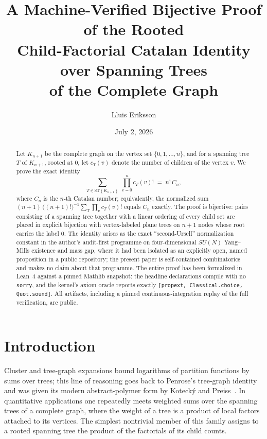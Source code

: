 \documentclass[11pt]{article}
\title{A Machine-Verified Bijective Proof of the Rooted\\
Child-Factorial Catalan Identity over Spanning Trees\\
of the Complete Graph}
\author{Lluis Eriksson}
\date{July 2, 2026}
\theoremstyle{remark}
\theoremstyle{definition}
\begin{document}
\maketitle

\begin{abstract}
Let $K_{n+1}$ be the complete graph on the vertex set $\{0,1,\dots,n\}$, and
for a spanning tree $T$ of $K_{n+1}$, rooted at $0$, let $c_T(v)$ denote the
number of children of the vertex $v$.  We prove the exact identity
\[
  \sum_{T \in \mathrm{ST}(K_{n+1})} \; \prod_{v=0}^{n} c_T(v)! \;=\; n!\,C_n ,
\]
where $C_n$ is the $n$-th Catalan number; equivalently, the normalized sum
$(n+1)\,\bigl((n+1)!\bigr)^{-1}\sum_T \prod_v c_T(v)!$ equals $C_n$ exactly.
The proof is bijective: pairs consisting of a spanning tree together with a
linear ordering of every child set are placed in explicit bijection with
vertex-labeled plane trees on $n+1$ nodes whose root carries the label $0$.
The identity arises as the exact ``second-Ursell'' normalization constant in
the author's audit-first programme on four-dimensional $SU(N)$ Yang--Mills
existence and mass gap, where it had been isolated as an explicitly
open, named proposition in a public repository; the present paper is self-contained
combinatorics and makes no claim about that programme.  The entire proof has
been formalized in Lean~4 against a pinned Mathlib snapshot: the headline
declarations compile with no \texttt{sorry}, and the kernel's axiom oracle
reports exactly \texttt{[propext, Classical.choice, Quot.sound]}.  All
artifacts, including a pinned continuous-integration replay of the full
verification, are public.
\end{abstract}

\section{Introduction}\label{sec:intro}

Cluster and tree-graph expansions bound logarithms of partition functions by
sums over trees; this line of reasoning goes back to Penrose's tree-graph
identity~\cite{Penrose1967} and was given its modern abstract-polymer form by
Koteck\'y and Preiss~\cite{KoteckyPreiss1986}.  In quantitative applications
one repeatedly meets weighted sums over the spanning trees of a complete
graph, where the weight of a tree is a product of local factors attached to
its vertices.  The simplest nontrivial member of this family assigns to a
rooted spanning tree the product of the factorials of its child counts.
\end{document}
